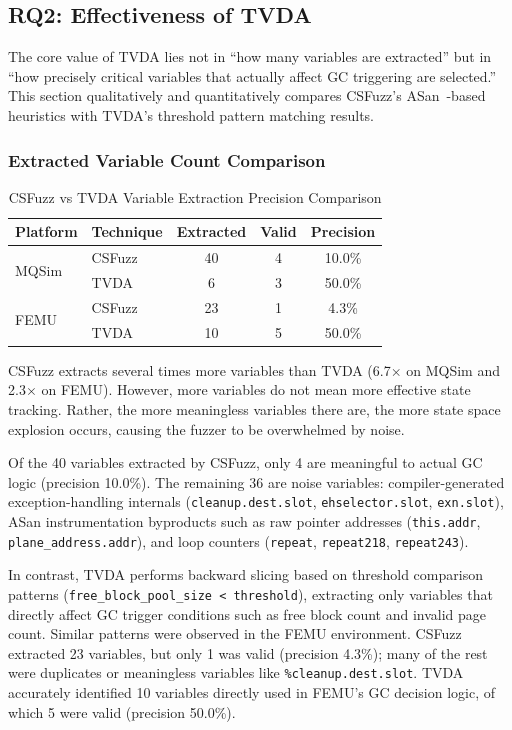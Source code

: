 \documentclass[conference]{IEEEtran}
\begin{document}
\subsection{RQ2: Effectiveness of TVDA}
The core value of TVDA lies not in ``how many variables are extracted'' but in ``how precisely critical variables that actually affect GC triggering are selected.'' This section qualitatively and quantitatively compares CSFuzz's ASan~\cite{asan}-based heuristics with TVDA's threshold pattern matching results.

\subsubsection{Extracted Variable Count Comparison}

\begin{table}[t]
\centering
\caption{CSFuzz vs TVDA Variable Extraction Precision Comparison}
\label{tab:precision}
\begin{tabularx}{\columnwidth}{@{}l X c c c@{}}
\toprule
\textbf{Platform} & \textbf{Technique} & \textbf{Extracted} & \textbf{Valid} & \textbf{Precision} \\
\midrule
\multirow{2}{*}{MQSim} & CSFuzz & 40 & 4 & 10.0\% \\
 & TVDA & 6 & 3 & 50.0\% \\
\midrule
\multirow{2}{*}{FEMU} & CSFuzz & 23 & 1 & 4.3\% \\
 & TVDA & 10 & 5 & 50.0\% \\
\bottomrule
\end{tabularx}
\end{table}

CSFuzz extracts several times more variables than TVDA (6.7$\times$ on MQSim and 2.3$\times$ on FEMU).
However, more variables do not mean more effective state tracking.
Rather, the more meaningless variables there are, the more state space explosion occurs, causing the fuzzer to be overwhelmed by noise.

Of the 40 variables extracted by CSFuzz, only 4 are meaningful to actual GC logic (precision 10.0\%).
The remaining 36 are noise variables: compiler-generated exception-handling internals (\texttt{cleanup.dest.slot}, \texttt{ehselector.slot}, \texttt{exn.slot}), ASan instrumentation byproducts such as raw pointer addresses (\texttt{this.addr}, \texttt{plane\_address.addr}), and loop counters (\texttt{repeat}, \texttt{repeat218}, \texttt{repeat243}).

In contrast, TVDA performs backward slicing based on threshold comparison patterns (\texttt{free\_block\_pool\_size < threshold}), extracting only variables that directly affect GC trigger conditions such as free block count and invalid page count.
Similar patterns were observed in the FEMU environment.
CSFuzz extracted 23 variables, but only 1 was valid (precision 4.3\%); many of the rest were duplicates or meaningless variables like \texttt{\%cleanup.dest.slot}.
TVDA accurately identified 10 variables directly used in FEMU's GC decision logic, of which 5 were valid (precision 50.0\%).
\end{document}
